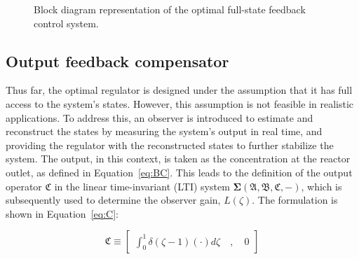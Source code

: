 \begin{figure}[!htbp]
    \centering
    \caption{Block diagram representation of the optimal full-state feedback control system.}
    \label{fig:block_diagram}
\end{figure}

\subsection{Output feedback compensator} \label{sec:output_design}

Thus far, the optimal regulator is designed under the assumption that it has full access to the system's states. However, this assumption is not feasible in realistic applications. To address this, an observer is introduced to estimate and reconstruct the states by measuring the system's output in real time, and providing the regulator with the reconstructed states to further stabilize the system. The output, in this context, is taken as the concentration at the reactor outlet, as defined in Equation~\ref{eq:BC}. This leads to the definition of the output operator $\mathfrak{C}$ in the linear time-invariant (LTI) system $\mathbf{\Sigma(\mathfrak{A},\mathfrak{B},\mathfrak{C},-)}$, which is subsequently used to determine the observer gain, ${L}(\zeta)$. The formulation is shown in Equation~\ref{eq:C}:

\begin{equation} \label{eq:C}
    \mathfrak{C} \equiv \begin{bmatrix}
        \int_0^1 \delta(\zeta-1) ( \cdot ) d\zeta \quad , \quad 0
    \end{bmatrix}
\end{equation}

